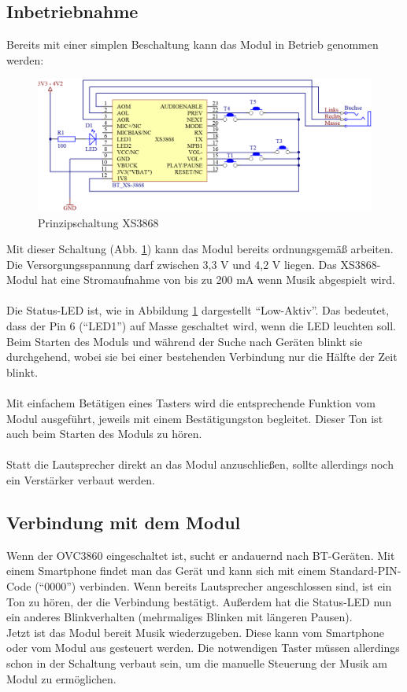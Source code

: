 \subsection*{Inbetriebnahme} \label{subsec:5.3.5}
Bereits mit einer simplen Beschaltung kann das Modul in Betrieb genommen werden:
\begin{figure} [H]
	\centering
	\includegraphics[width=1\textwidth]{img/BTModul/XS3868_Prinzipschaltung.png}
	\caption{Prinzipschaltung XS3868}\label {fig:5.3.5.1}
\end{figure} 
Mit dieser Schaltung (Abb. \ref {fig:5.3.5.1}) kann das Modul bereits ordnungsgemäß arbeiten.
\\
Die Versorgungsspannung darf zwischen 3,3 V und 4,2 V liegen.
Das XS3868-Modul hat eine Stromaufnahme von bis zu 200 mA wenn Musik abgespielt wird.
\\ \\
Die Status-LED ist, wie in Abbildung \ref {fig:5.3.5.1} dargestellt \enquote{Low-Aktiv}.
Das bedeutet, dass der Pin 6 (\enquote{LED1}) auf Masse geschaltet wird, wenn die LED leuchten soll.
Beim Starten des Moduls und während der Suche nach Geräten blinkt sie durchgehend, wobei sie bei einer bestehenden Verbindung nur die Hälfte der Zeit blinkt.
\\ \\
Mit einfachem Betätigen eines Tasters wird die entsprechende Funktion vom Modul ausgeführt, jeweils mit einem Bestätigungston begleitet.
Dieser Ton ist auch beim Starten des Moduls zu hören.
\\ \\
Statt die Lautsprecher direkt an das Modul anzuschließen, sollte allerdings noch ein Verstärker verbaut werden.
\newpage


\subsection*{Verbindung mit dem Modul} \label{subsec:5.3.6}
Wenn der OVC3860 eingeschaltet ist, sucht er andauernd nach BT-Geräten.
Mit einem Smartphone findet man das Gerät und kann sich mit einem Standard-PIN-Code (\enquote{0000}) verbinden.
Wenn bereits Lautsprecher angeschlossen sind, ist ein Ton zu hören, der die Verbindung bestätigt.
Außerdem hat die Status-LED nun ein anderes Blinkverhalten (mehrmaliges Blinken mit längeren Pausen).
\\
Jetzt ist das Modul bereit Musik wiederzugeben.
Diese kann vom Smartphone oder vom Modul aus gesteuert werden.
Die notwendigen Taster müssen allerdings schon in der Schaltung verbaut sein, um die manuelle Steuerung der Musik am Modul zu ermöglichen.


